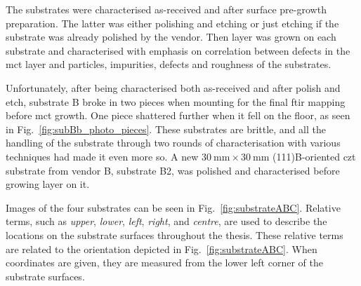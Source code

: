 The substrates were characterised as-received and after surface pre-growth preparation. The latter was either polishing and etching or just etching if the substrate was already polished by the vendor. Then  layer was grown on each substrate and characterised with emphasis on correlation between defects in the \ac{mct} layer and particles, impurities, defects and roughness of the substrates.

Unfortunately, after being characterised both as-received and after polish and etch, substrate B broke in two pieces when mounting for the final \ac{ftir} mapping before \ac{mct} growth. One piece shattered further when it fell on the floor, as seen in Fig.~\ref{fig:subBb_photo_pieces}. These substrates are brittle, and all the handling of the substrate through two rounds of characterisation with various techniques had made it even more so. A new $\SI{30}{\milli\metre}\times\SI{30}{\milli\metre}$ (111)B-oriented \ac{czt} substrate from vendor B, substrate B2, was polished and characterised before growing  layer on it.

Images of the four substrates can be seen in Fig.~\ref{fig:substrateABC}. Relative terms, such as \emph{upper}, \emph{lower}, \emph{left}, \emph{right}, and \emph{centre}, are used to describe the locations on the substrate surfaces throughout the thesis. These relative terms are related to the orientation depicted in Fig.~\ref{fig:substrateABC}. When coordinates are given, they are measured from the lower left corner of the substrate surfaces. %

